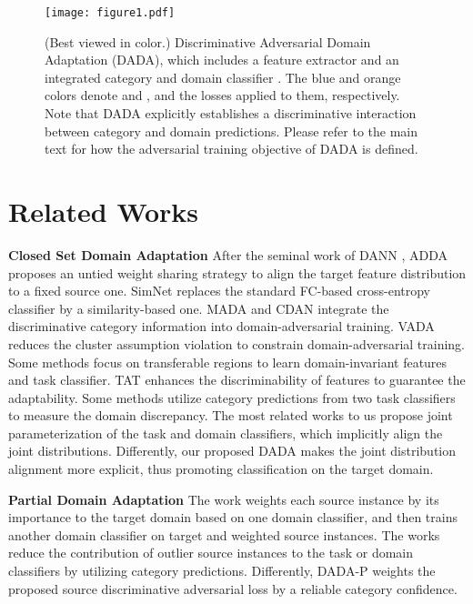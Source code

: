 \documentclass[letterpaper]{article} \usepackage{aaai20}  \usepackage{times}  \usepackage{helvet} \usepackage{courier}  \usepackage[hyphens]{url}  \usepackage{graphicx} \urlstyle{rm} \def\UrlFont{\rm}  \usepackage{graphicx}  \frenchspacing  \setlength{\pdfpagewidth}{8.5in}  \setlength{\pdfpageheight}{11in}
\begin{document}
\begin{figure*}[t]
	\centering
	\texttt{[image: figure1.pdf]}
	\caption{(Best viewed in color.) Discriminative Adversarial Domain Adaptation (DADA), which includes a feature extractor  and an integrated category and domain classifier . The blue and orange colors denote  and , and the losses applied to them, respectively. Note that DADA explicitly establishes a discriminative interaction between category and domain predictions. Please refer to the main text for how the adversarial training objective of DADA is defined.
	}
	\label{fig:dada} 
\end{figure*}

\section{Related Works}
\noindent\textbf{Closed Set Domain Adaptation} After the seminal work of DANN \cite{dann}, ADDA \cite{adda} proposes an untied weight sharing strategy to align the target feature distribution to a fixed source one. SimNet \cite{SimNet} replaces the standard FC-based cross-entropy classifier by a similarity-based one. MADA \cite{mada} and CDAN \cite{cdan} integrate the discriminative category information into domain-adversarial training. VADA \cite{dirt_t} reduces the cluster assumption violation to constrain domain-adversarial training. Some methods \cite{tada,hla} focus on transferable regions to learn domain-invariant features and task classifier. TAT \cite{tat} enhances the discriminability of features to guarantee the adaptability. Some methods \cite{mcd,adr,swd} utilize category predictions from two task classifiers to measure the domain discrepancy. The most related works \cite{idda,dann_ca} to us propose joint parameterization of the task and domain classifiers, which implicitly align the joint distributions. Differently, our proposed DADA makes the joint distribution alignment more explicit, thus promoting classification on the target domain.

\noindent\textbf{Partial Domain Adaptation} The work \cite{iwan} weights each source instance by its importance to the target domain based on one domain classifier, and then trains another domain classifier on target and weighted source instances. The works \cite{san,pada} reduce the contribution of outlier source instances to the task or domain classifiers by utilizing category predictions. Differently, DADA-P weights the proposed source discriminative adversarial loss by a reliable category confidence.
\end{document}
